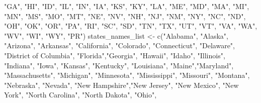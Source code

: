 \documentclass[
  11 pt,
  openany]{book}
\newenvironment{Shaded}{\begin{snugshade}}{\end{snugshade}}
\newcommand{\FunctionTok}[1]{\textcolor[rgb]{0.00,0.00,0.00}{#1}}
\newcommand{\NormalTok}[1]{#1}
\newcommand{\OtherTok}[1]{\textcolor[rgb]{0.56,0.35,0.01}{#1}}
\newcommand{\StringTok}[1]{\textcolor[rgb]{0.31,0.60,0.02}{#1}}
\begin{document}
\begin{Shaded}
\begin{Highlighting}[]
    \StringTok{"GA"}\NormalTok{, }\StringTok{"HI"}\NormalTok{, }\StringTok{"ID"}\NormalTok{, }\StringTok{"IL"}\NormalTok{, }\StringTok{"IN"}\NormalTok{, }\StringTok{"IA"}\NormalTok{, }\StringTok{"KS"}\NormalTok{, }\StringTok{"KY"}\NormalTok{, }\StringTok{"LA"}\NormalTok{, }\StringTok{"ME"}\NormalTok{,}
    \StringTok{"MD"}\NormalTok{, }\StringTok{"MA"}\NormalTok{, }\StringTok{"MI"}\NormalTok{, }\StringTok{"MN"}\NormalTok{, }\StringTok{"MS"}\NormalTok{, }\StringTok{"MO"}\NormalTok{, }\StringTok{"MT"}\NormalTok{, }\StringTok{"NE"}\NormalTok{, }\StringTok{"NV"}\NormalTok{, }\StringTok{"NH"}\NormalTok{,}
    \StringTok{"NJ"}\NormalTok{, }\StringTok{"NM"}\NormalTok{, }\StringTok{"NY"}\NormalTok{, }\StringTok{"NC"}\NormalTok{, }\StringTok{"ND"}\NormalTok{, }\StringTok{"OH"}\NormalTok{, }\StringTok{"OK"}\NormalTok{, }\StringTok{"OR"}\NormalTok{, }\StringTok{"PA"}\NormalTok{, }\StringTok{"RI"}\NormalTok{,}
    \StringTok{"SC"}\NormalTok{, }\StringTok{"SD"}\NormalTok{, }\StringTok{"TN"}\NormalTok{, }\StringTok{"TX"}\NormalTok{, }\StringTok{"UT"}\NormalTok{, }\StringTok{"VT"}\NormalTok{, }\StringTok{"VA"}\NormalTok{, }\StringTok{"WA"}\NormalTok{, }\StringTok{"WV"}\NormalTok{, }\StringTok{"WI"}\NormalTok{,}
    \StringTok{"WY"}\NormalTok{, }\StringTok{"PR"}\NormalTok{)}
\NormalTok{states\_names\_list }\OtherTok{\textless{}{-}} 
  \FunctionTok{c}\NormalTok{(}\StringTok{"Alabama"}\NormalTok{, }\StringTok{"Alaska"}\NormalTok{, }\StringTok{"Arizona"}\NormalTok{, }\StringTok{"Arkansas"}\NormalTok{, }\StringTok{"California"}\NormalTok{, }
    \StringTok{"Colorado"}\NormalTok{, }\StringTok{"Connecticut"}\NormalTok{, }\StringTok{"Delaware"}\NormalTok{, }\StringTok{"District of Columbia"}\NormalTok{, }
    \StringTok{"Florida"}\NormalTok{,}\StringTok{"Georgia"}\NormalTok{, }\StringTok{"Hawaii"}\NormalTok{, }\StringTok{"Idaho"}\NormalTok{, }\StringTok{"Illinois"}\NormalTok{, }\StringTok{"Indiana"}\NormalTok{, }
    \StringTok{"Iowa"}\NormalTok{, }\StringTok{"Kansas"}\NormalTok{, }\StringTok{"Kentucky"}\NormalTok{, }\StringTok{"Louisiana"}\NormalTok{, }\StringTok{"Maine"}\NormalTok{,}\StringTok{"Maryland"}\NormalTok{, }
    \StringTok{"Massachusetts"}\NormalTok{, }\StringTok{"Michigan"}\NormalTok{, }\StringTok{"Minnesota"}\NormalTok{, }\StringTok{"Mississippi"}\NormalTok{, }\StringTok{"Missouri"}\NormalTok{, }
    \StringTok{"Montana"}\NormalTok{, }\StringTok{"Nebraska"}\NormalTok{, }\StringTok{"Nevada"}\NormalTok{, }\StringTok{"New Hampshire"}\NormalTok{,}\StringTok{"New Jersey"}\NormalTok{, }
    \StringTok{"New Mexico"}\NormalTok{, }\StringTok{"New York"}\NormalTok{, }\StringTok{"North Carolina"}\NormalTok{, }\StringTok{"North Dakota"}\NormalTok{, }\StringTok{"Ohio"}\NormalTok{, }

\end{Highlighting}
\end{Shaded}
\end{document}
